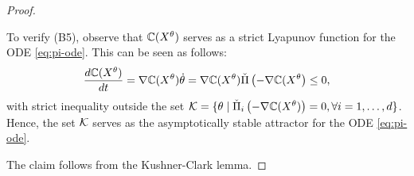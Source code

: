\begin{proof}
\begin{inparaenum}[$\bullet$]
\item To verify (B5), observe that $\mathbb{C}(X^{\theta})$ serves as a strict Lyapunov function for the ODE \eqref{eq:pi-ode}. This can be seen as follows:
$$ \dfrac{d \mathbb{C}(X^{\theta})}{dt} = \nabla \mathbb{C}(X^{\theta}) \dot \theta = \nabla \mathbb{C}(X^{\theta}) \check\Pi \left(-\nabla \mathbb{C}(X^{\theta}\right) \le 0,$$
with strict inequality outside the set $\mathcal{K} = \{\theta \mid \check\Pi_{i} \left(-\nabla \mathbb{C}(X^{\theta})\right)=0, \forall i=1,\ldots,d\}$. Hence, the set $\mathcal{K}$ serves as the asymptotically stable attractor for the ODE \eqref{eq:pi-ode}.
\end{inparaenum} 
The claim follows from the Kushner-Clark lemma.
\end{proof}
% 
% 
